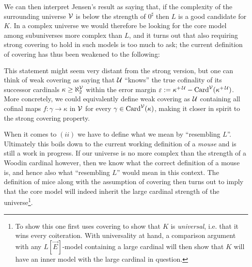 \documentclass[../../main]{subfiles}
\begin{document}

We can then interpret Jensen's result as saying that, if the complexity of the surrounding universe $\operatorname{\mathcal V}$ is below the strength of $0^\sharp$ then $L$ is a good candidate for $K$. In a complex universe we would therefore be looking for the core model among subuniverses more complex than $L$, and it turns out that also requiring strong covering to hold in such models is too much to ask; the current definition of covering has thus been weakened to the following:


This statement might seem very distant from the strong version, but one can think of weak covering as saying that $\operatorname{\mathcal U}$ ``knows'' the true cofinality of its successor cardinals $\kappa\geq\aleph_2^{\operatorname{\mathcal V}}$ within the error margin $\varepsilon:=\kappa^{+\operatorname{\mathcal U}}-\operatorname{Card}^{\operatorname{\mathcal V}}(\kappa^{+\operatorname{\mathcal U}})$. More concretely, we could equivalently define weak covering as $\operatorname{\mathcal U}$ containing all cofinal maps $f\colon\gamma\to\kappa$ in $\operatorname{\mathcal V}$ for every $\gamma\in\operatorname{Card}^{\operatorname{\mathcal V}}(\kappa)$, making it closer in spirit to the strong covering property.



\qquad When it comes to $(ii)$ we have to define what we mean by ``resembling $L$''. Ultimately this boils down to the current working definition of a \textit{mouse} and is still a work in progress. If our universe is no more complex than the strength of a Woodin cardinal however, then we know what the correct definition of a mouse is, and hence also what ``resembling $L$'' would mean in this context. The definition of mice along with the assumption of covering then turns out to imply that the core model will indeed inherit the large cardinal strength of the universe\footnote{To show this one first uses covering to show that $K$ is \textit{universal}, i.e. that it wins every coiteration. With universality at hand, a comparison argument with any $L[\vec E]$-model containing a large cardinal will then show that $K$ will have an inner model with the large cardinal in question.}.
\end{document}
